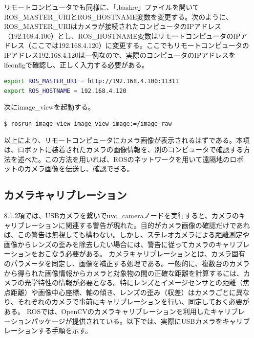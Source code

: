 リモートコンピュータでも同様に、「.bashrc」ファイルを開いてROS\_MASTER\_URIとROS\_HOSTNAME変数を変更する。次のように、ROS\_MASTER\_URIはカメラが接続されたコンピュータのIPアドレス（192.168.4.100）とし、ROS\_HOSTNAME変数はリモートコンピュータのIPアドレス（ここでは192.168.4.120）に変更する。ここでもリモートコンピュータのIPアドレス192.168.4.120は一例なので、実際のコンピュータのIPアドレスをifconfigで確認し、正しく入力する必要がある。

\begin{lstlisting}[language=bash]
export ROS_MASTER_URI = http://192.168.4.100:11311
export ROS_HOSTNAME = 192.168.4.120
\end{lstlisting}

次にimage\_viewを起動する。

\begin{lstlisting}[language=ROS]
$ rosrun image_view image_view image:=/image_raw
\end{lstlisting}

以上により、リモートコンピュータにカメラ画像が表示されるはずである。本項は、ロボットに装着されたカメラの画像情報を、別のコンピュータで確認する方法を述べた。この方法を用いれば、ROSのネットワークを用いて遠隔地のロボットのカメラ画像を伝送し、確認できる。

\subsection{カメラキャリブレーション}

8.1.2項では、USBカメラを繋いでuvc\_cameraノードを実行すると、カメラのキャリブレーションに関連する警告が現れた。目的がカメラ画像の確認だけであれば、この警告は無視しても構わない。しかし、ステレオカメラによる距離測定や画像からレンズの歪みを除去したい場合には、警告に従ってカメラのキャリブレーションをおこなう必要がある。
カメラキャリブレーションとは、カメラ固有のパラメータを同定し、画像を補正する処理である。一般的に、複数台のカメラから得られた画像情報からカメラと対象物の間の正確な距離を計算するには、カメラの光学特性の情報が必要となる。特にレンズとイメージセンサとの距離（焦点距離）や画像中心座標、軸の傾き、レンズの歪み（収差）はカメラごとに異なり、それぞれのカメラで事前にキャリブレーションを行い、同定しておく必要がある。
ROSでは、OpenCVのカメラキャリブレーションを利用したキャリブレーションパッケージが提供されている。以下では、実際にUSBカメラをキャリブレーションする手順を示す。


